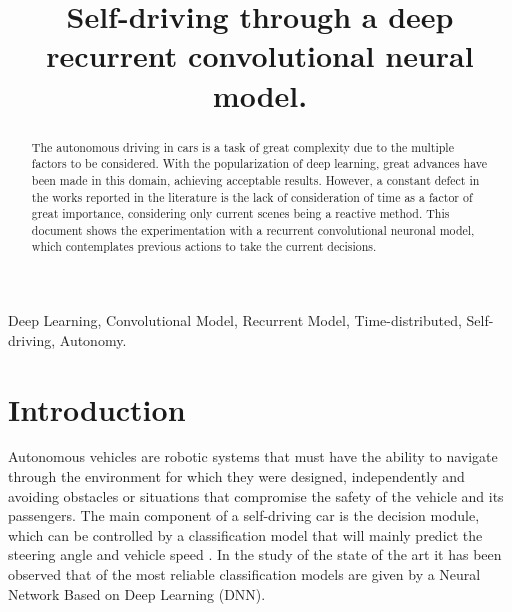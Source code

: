 \documentclass[conference]{IEEEtran}
\begin{document}
\title{Self-driving	through a deep recurrent convolutional neural model.}
\author{
	

\and


}
\maketitle

\begin{abstract}
The autonomous driving in cars is a task of great complexity due to the multiple factors to be considered. With the popularization of deep learning, great advances have been made in this domain, achieving acceptable results. However, a constant defect in the works reported in the literature is the lack of consideration of time as a factor of great importance, considering only current scenes being a reactive method. This document shows the experimentation with a recurrent convolutional neuronal model, which contemplates previous actions to take the current decisions.
\end{abstract}

\begin{IEEEkeywords}
Deep Learning, Convolutional Model, Recurrent Model, Time-distributed, Self-driving, Autonomy.
\end{IEEEkeywords}

\section{Introduction}
Autonomous vehicles are robotic systems that must have the ability to navigate through the environment for which they were designed, independently and avoiding obstacles or situations that compromise the safety of the vehicle and its passengers. The main component of a self-driving car is the decision module, which can be controlled by a classification model that will mainly predict the steering angle and vehicle speed \cite{litman2017autonomous}. In the study of the state of the art it has been observed that of the most reliable classification models are given by a Neural Network Based on Deep Learning (DNN).
\end{document}
